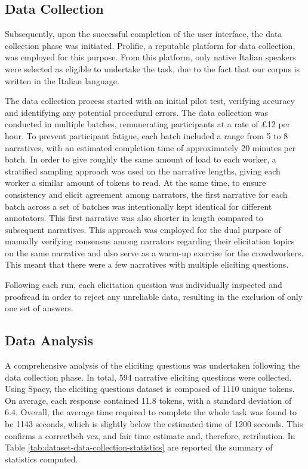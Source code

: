 \subsection{Data Collection}
\label{cha:methodology-data-collection}
Subsequently, upon the successful completion of the user interface, the data collection phase was initiated. Prolific, a reputable platform \cite{prolific} for data collection, was employed for this purpose. From this platform, only native Italian speakers were selected as eligible to undertake the task, due to the fact that our corpus is written in the Italian language.

The data collection process started with an initial pilot test, verifying accuracy and identifying any potential procedural errors. The data collection was conducted in multiple batches, remunerating participants at a rate of £12 per hour. To prevent participant fatigue, each batch included a range from 5 to 8 narratives, with an estimated completion time of approximately 20 minutes per batch. In order to give roughly the same amount of load to each worker, a stratified sampling approach was used on the narrative lengths, giving each worker a similar amount of tokens to read. At the same time, to ensure consistency and elicit agreement among narrators, the first narrative for each batch across a set of batches was intentionally kept identical for different annotators. This first narrative was also shorter in length compared to subsequent narratives. This approach was employed for the dual purpose of manually verifying consensus among narrators regarding their elicitation topics on the same narrative and also serve as a warm-up exercise for the crowdworkers. This meant that there were a few narratives with multiple eliciting questions.

Following each run, each elicitation question was individually inspected and proofread in order to reject any unreliable data, resulting in the exclusion of only one set of answers.


\subsection{Data Analysis}
\label{cha:methodology-crowdsourcing-data-analysis}


A comprehensive analysis of the eliciting questions was undertaken following the data collection phase. In total, 594 narrative eliciting questions were collected. Using Spacy, the eliciting questions dataset is composed of 1110 unique tokens. On average, each response contained 11.8 tokens, with a standard deviation of 6.4. Overall, the average time required to complete the whole task was found to be 1143 seconds, which is slightly below the estimated time of 1200 seconds. This confirms a correctbeh vez, and fair time estimate and, therefore, retribution. In Table \ref{tab:dataset-data-collection-statistics} are reported the summary of statistics computed. 

